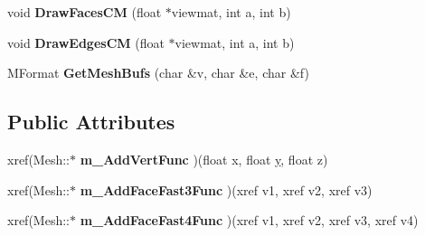 \begin{DoxyCompactItemize}
\item 
\hypertarget{class_mesh_afcf7b54820f8304a84127a0d2cc86963}{void {\bfseries Draw\+Faces\+C\+M} (float $\ast$viewmat, int a, int b)}\label{class_mesh_afcf7b54820f8304a84127a0d2cc86963}

\item 
\hypertarget{class_mesh_af2b1e09543193588f78582fa43637889}{void {\bfseries Draw\+Edges\+C\+M} (float $\ast$viewmat, int a, int b)}\label{class_mesh_af2b1e09543193588f78582fa43637889}

\item 
\hypertarget{class_mesh_a84758ea70e2b7b4fd2c25fd70b1ba250}{M\+Format {\bfseries Get\+Mesh\+Bufs} (char \&v, char \&e, char \&f)}\label{class_mesh_a84758ea70e2b7b4fd2c25fd70b1ba250}

\end{DoxyCompactItemize}
\subsection*{Public Attributes}
\begin{DoxyCompactItemize}
\item 
\hypertarget{class_mesh_a27b07450ab2d3f62ad50873ca567b334}{xref(Mesh\+::$\ast$ {\bfseries m\+\_\+\+Add\+Vert\+Func} )(float x, float \hyperlink{_ice_utils_8h_aa7ffaed69623192258fb8679569ff9ba}{y}, float z)}\label{class_mesh_a27b07450ab2d3f62ad50873ca567b334}

\item 
\hypertarget{class_mesh_a9fe54b2a56e002ba867a4cfd2068cd39}{xref(Mesh\+::$\ast$ {\bfseries m\+\_\+\+Add\+Face\+Fast3\+Func} )(xref v1, xref v2, xref v3)}\label{class_mesh_a9fe54b2a56e002ba867a4cfd2068cd39}

\item 
\hypertarget{class_mesh_a3a2591335d596fb9f32a40d6b04f599f}{xref(Mesh\+::$\ast$ {\bfseries m\+\_\+\+Add\+Face\+Fast4\+Func} )(xref v1, xref v2, xref v3, xref v4)}\label{class_mesh_a3a2591335d596fb9f32a40d6b04f599f}

\end{DoxyCompactItemize}
